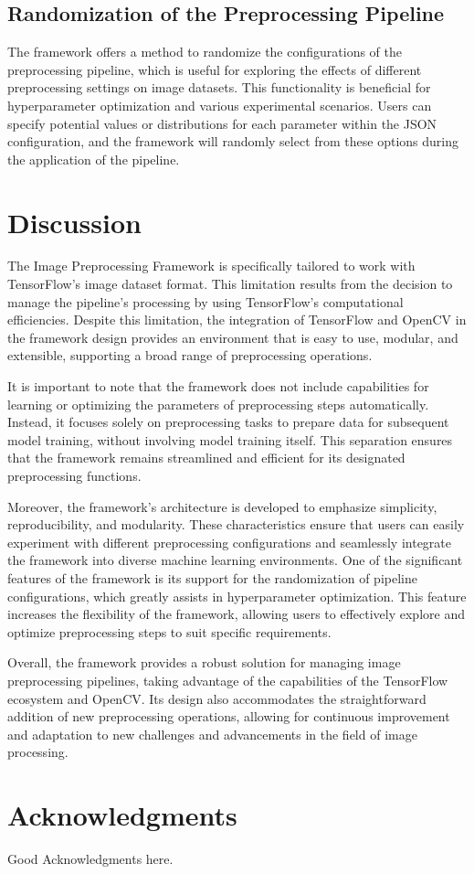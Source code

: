 \documentclass[journal]{new-aiaa}
\begin{document}
\subsection{Randomization of the Preprocessing Pipeline}
The framework offers a method to randomize the configurations of the preprocessing pipeline, which is useful for exploring the effects of different preprocessing settings on image datasets. This functionality is beneficial for hyperparameter optimization and various experimental scenarios. Users can specify potential values or distributions for each parameter within the JSON configuration, and the framework will randomly select from these options during the application of the pipeline.


\section{Discussion}
The Image Preprocessing Framework is specifically tailored to work with TensorFlow's image dataset format. This limitation results from the decision to manage the pipeline's processing by using TensorFlow's computational efficiencies. Despite this limitation, the integration of TensorFlow and OpenCV in the framework design provides an environment that is easy to use, modular, and extensible, supporting a broad range of preprocessing operations.

It is important to note that the framework does not include capabilities for learning or optimizing the parameters of preprocessing steps automatically. Instead, it focuses solely on preprocessing tasks to prepare data for subsequent model training, without involving model training itself. This separation ensures that the framework remains streamlined and efficient for its designated preprocessing functions.

Moreover, the framework's architecture is developed to emphasize simplicity, reproducibility, and modularity. These characteristics ensure that users can easily experiment with different preprocessing configurations and seamlessly integrate the framework into diverse machine learning environments. One of the significant features of the framework is its support for the randomization of pipeline configurations, which greatly assists in hyperparameter optimization. This feature increases the flexibility of the framework, allowing users to effectively explore and optimize preprocessing steps to suit specific requirements.

Overall, the framework provides a robust solution for managing image preprocessing pipelines, taking advantage of the capabilities of the TensorFlow ecosystem and OpenCV. Its design also accommodates the straightforward addition of new preprocessing operations, allowing for continuous improvement and adaptation to new challenges and advancements in the field of image processing.



\section*{Acknowledgments}
Good Acknowledgments here.


\end{document}
